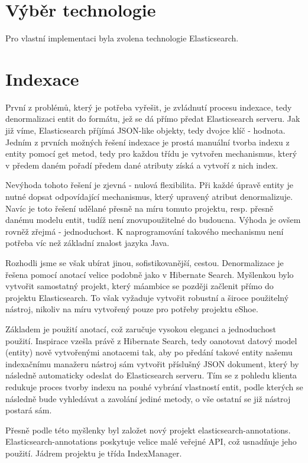 \documentclass[11pt,draft,oneside]{fithesis2}
\begin{document}
\section{Výběr technologie}
Pro vlastní implementaci byla zvolena technologie Elasticsearch. 

\section{Indexace}
První z problémů, který je potřeba vyřešit, je zvládnutí procesu indexace, tedy denormalizaci entit do formátu, jež se dá přímo předat Elasticsearch serveru. Jak již víme, Elasticsearch příjímá JSON-like objekty,
tedy dvojce klíč - hodnota.
Jedním z prvních možných řešení indexace je prostá manuální tvorba indexu z entity pomocí get metod, tedy pro každou třídu je vytvořen mechanismus, který v předem daném pořadí předem dané atributy získá a vytvoří z nich index.

Nevýhoda tohoto řešení je zjevná - nulová flexibilita. Při každé úpravě entity je nutné dopsat odpovídající mechanismus, který upravený atribut denormalizuje. Navíc je toto řešení udělané přesně na míru tomuto projektu, resp. přesně danému modelu entit,
tudíž není znovupoužitelné do budoucna. Výhoda je ovšem rovněž zřejmá - jednoduchost. K naprogramování takového mechanismu není potřeba víc než základní znalost jazyka Java.

Rozhodli jsme se však ubírat jinou, sofistikovanější, cestou. Denormalizace je řešena pomocí anotací velice podobně jako v Hibernate Search. Myšlenkou bylo vytvořit samostatný projekt, který máambice se později začlenit přímo do projektu
Elasticsearch. To však vyžaduje vytvořit robustní a široce použitelný nástroj, nikoliv na míru vytvořený pouze pro potřeby projektu eShoe. 

Základem je použití anotací, což zaručuje vysokou eleganci a jednoduchost použití. Inspirace vzešla právě z Hibernate Search, tedy oanotovat datový model (entity) nově vytvořenými anotacemi tak, aby po předání takové entity našemu indexačnímu manažeru
nástroj sám vytvořit příslušný JSON dokument, který by následně automaticky odeslat do Elasticsearch serveru. Tím se z pohledu klienta redukuje proces tvorby indexu na pouhé vybrání vlastností entit, podle kterých se následně bude vyhledávat a
zavolání jediné metody, o vše ostatní se již nástroj postará sám.

Přesně podle této myšlenky byl založet nový projekt elasticsearch-annotations. Elasticsearch-annotations poskytuje velice malé veřejné API, což usnadňuje jeho použití. Jádrem projektu je třída IndexManager.
\end{document}

